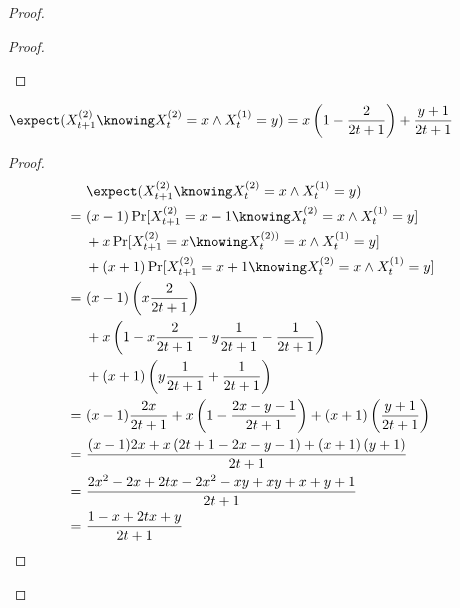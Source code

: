 \begin{proof}
\begin{proof}
\begin{itemize}
        \end{itemize}
    \end{proof}

    \vbox{}
    

    \vbox{}

    \begin{lemma}\label{l:pref-att-4}
        $\displaystyle \expect(X_{t + 1}^{(2)} \knowing X_t^{(2)} = x \wedge X_t^{(1)} = y) = x \left( 1 - \frac{2}{2t + 1} \right) + \frac{y + 1}{2t + 1}$
    \end{lemma}

    \begin{proof}
        \begin{align*}
            &\ \expect(X_{t + 1}^{(2)} \knowing X_t^{(2)} = x \wedge X_t^{(1)} = y)                                                         & \\
            =&\ (x - 1) \Pr[X_{t + 1}^{(2)} = x - 1 \knowing X_t^{(2)} = x \wedge X_t^{(1)} = y]                                            & \\
            &\; + x \Pr[X_{t + 1}^{(2)} = x \knowing X_t^{(2))} = x \wedge X_t^{(1)} = y]                                                   & \\
            &\; + (x + 1) \Pr[X_{t + 1}^{(2)} = x + 1 \knowing X_t^{(2)} = x \wedge X_t^{(1)} = y]                                          & \\
            =&\ (x - 1) \left( x \frac{2}{2t + 1} \right)                                                                                   & \\
            &\; + x \left( 1 - x \frac{2}{2t + 1} - y \frac{1}{2t + 1} - \frac{1}{2t + 1} \right)                                           & \\
            &\; + (x + 1) \left( y \frac{1}{2t + 1} + \frac{1}{2t + 1} \right)                                                              & \\
            =&\ (x - 1) \frac{2x}{2t + 1} + x \left( 1 - \frac{2x - y - 1}{2t + 1} \right) + (x + 1) \left( \frac{y + 1}{2t + 1} \right)    & \\
            =&\ \frac{(x - 1) {2x} + x \left( 2t + 1 - 2x - y - 1 \right) + (x + 1) \left( {y + 1} \right)}{2t + 1}                         & \\
            =&\ \frac{2x^2 - 2x + 2tx - 2x^2 - xy + xy + x + y + 1}{2t + 1}                                                                 & \\
            =&\ \frac{1 - x + 2tx + y}{2t + 1}                                                                                              &
        \end{align*}
    \end{proof}


\end{proof}
